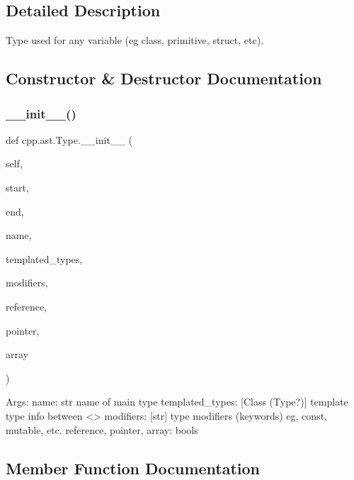 \subsection{Detailed Description}
\begin{DoxyVerb}Type used for any variable (eg class, primitive, struct, etc).\end{DoxyVerb}
 

\subsection{Constructor \& Destructor Documentation}
\mbox{\label{classcpp_1_1ast_1_1_type_adc20d88db721b5d7b513c08a4d6753c9}} 
\subsubsection{\texorpdfstring{\+\_\+\+\_\+init\+\_\+\+\_\+()}{\_\_init\_\_()}}
{\footnotesize\ttfamily def cpp.\+ast.\+Type.\+\_\+\+\_\+init\+\_\+\+\_\+ (\begin{DoxyParamCaption}\item[{}]{self,  }\item[{}]{start,  }\item[{}]{end,  }\item[{}]{name,  }\item[{}]{templated\+\_\+types,  }\item[{}]{modifiers,  }\item[{}]{reference,  }\item[{}]{pointer,  }\item[{}]{array }\end{DoxyParamCaption})}

\begin{DoxyVerb}Args:
  name: str name of main type
  templated_types: [Class (Type?)] template type info between <>
  modifiers: [str] type modifiers (keywords) eg, const, mutable, etc.
  reference, pointer, array: bools
\end{DoxyVerb}
 

\subsection{Member Function Documentation}
\mbox{\label{classcpp_1_1ast_1_1_type_a1a10eff21f6150b7e14bde3788fa069b}} 
